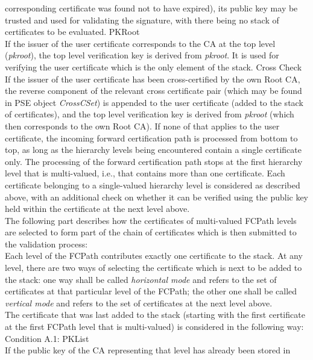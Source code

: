 corresponding certificate was found not to have expired), its public
key may be trusted and used for validating the signature, with there being no stack of 
certificates to be evaluated.
\m PKRoot \\
If the issuer of the user certificate corresponds to the CA at the top level
({\em pkroot}), the top level verification key is derived from {\em pkroot}. It is 
used for verifying the user certificate which is the only element of the stack.
\m Cross Check \\
If the issuer of the user certificate has been cross-certified by the own Root CA, the 
reverse component of the relevant cross certificate pair (which may be found in PSE
object {\em CrossCSet}) is appended to the user certificate (added to the stack of certificates), 
and the top level verification key is derived from {\em pkroot} (which then corresponds
to the own Root CA).
\ee
If none of that applies to the user certificate, the incoming forward certification path
is processed from bottom to top, as long as the hierarchy levels being encountered contain
a single certificate only. The processing of the forward certification path stops
at the first hierarchy level that is multi-valued, i.e., that contains more than one
certificate.
Each certificate belonging to a single-valued hierarchy level is considered as described
above, with an additional check on whether it can be verified using the public key held 
within the certificate at the next level above.
\\ [1em]
The following part describes how the certificates of multi-valued FCPath levels are selected
to form part of the chain of certificates which is then submitted to the validation process:
\\ [1em]
Each level of the FCPath contributes exactly one certificate to the stack.
At any level, there are two ways of selecting the certificate which is next to be 
added to the stack: one way shall be called {\em horizontal mode} and refers to the 
set of certificates at that particular level of the FCPath; the other one shall be 
called {\em vertical mode} and refers to the set of certificates at the next level 
above. \\
The certificate that was last added to the stack (starting with the first certificate 
at the first FCPath level that is multi-valued) is considered in the 
following way:
\\ [1em]
Condition A.1: PKList \\
If the public key of the CA representing that level has already been stored in 
